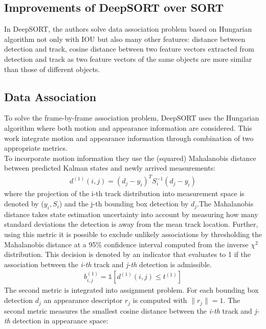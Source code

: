     \subsection{Improvements of DeepSORT over SORT}
        In DeepSORT, the authors solve data association problem based on Hungarian algorithm not only with IOU but also many other features: distance between detection and track, cosine distance between two feature vectors extracted from detection and track as two feature vectors of the same objects are more similar than 
        those of different objects. 
    \subsection{Data Association}
        To solve the frame-by-frame association problem, DeepSORT uses the Hungarian algorithm where both motion and appearance information are considered. This work integrate motion and appearance information through combination of two appropriate metrics. \\ 
        \vspace{3mm}
        To incorporate motion information they use the (squared) Mahalanobis distance between predicted Kalman states and newly arrived measurements:
        \begin{align}
            d^{(1)} (i,j) = (d_j - y_i)^T S_i^{-1} (d_j - y_i)
        \end{align}
        where the projection of the i-th track distribution into measurement space is denoted by ($y_i, S_i$) and the j-th bounding box detection by \emph{$d_j$}.The Mahalanobis distance takes state estimation uncertainty into account by measuring how many standard deviations the detection is away from the mean track location. 
        Further, using this metric it is possible to exclude unlikely associations by thresholding the Mahalanobis distance at a 95\% confidence interval computed from the inverse $\chi^2$ distribution. This decision is denoted by an indicator that evaluates to 1 if the association between the \emph{i-th} track and \emph{j-th} detection is admissible.
        \begin{align}
            b_{i,j}^{(1)} = \mathbb{1} [d^{(1)} (i,j) \leq t^{(1)}]
        \end{align}
        The second metric is integrated into assignment problem. For each bounding box detection $d_j$ an appearance descriptor $r_j$ is computed with $\parallel r_j \parallel = 1$. The second metric measures the smallest cosine distance between the \emph{i-th} track and \emph{j-th} detection in appearance space:
